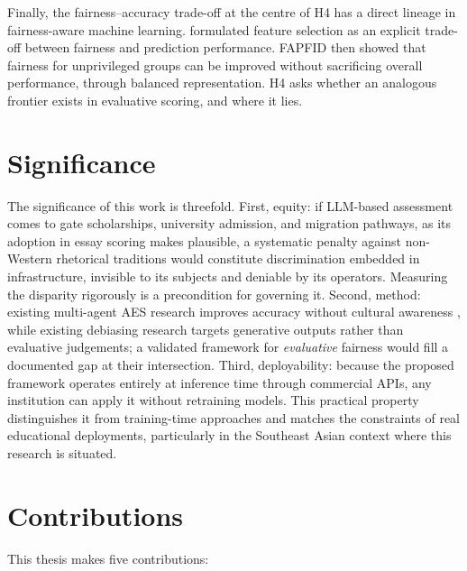 Finally, the fairness--accuracy trade-off at the centre of H4 has a
direct lineage in fairness-aware machine learning.
\citet{dorleon2022feature} formulated feature selection as an explicit
trade-off between fairness and prediction performance. FAPFID
\citep{dorleon2023fapfid} then showed that fairness for unprivileged
groups can be improved without sacrificing overall performance,
through balanced representation. H4 asks whether an analogous frontier
exists in evaluative scoring, and where it lies.

\section{Significance}
\label{sec:significance}

The significance of this work is threefold. First, equity: if
LLM-based assessment comes to gate scholarships, university
admission, and migration pathways, as its adoption in essay scoring
makes plausible, a systematic penalty against non-Western
rhetorical traditions would constitute discrimination embedded in
infrastructure, invisible to its subjects and deniable by its
operators. Measuring the disparity rigorously is a precondition for
governing it. Second, method: existing multi-agent AES research
improves accuracy without cultural awareness
\citep[e.g.,][]{su2025cafes}, while existing debiasing research targets
generative outputs rather than evaluative judgements; a validated
framework for \emph{evaluative} fairness would fill a documented gap at
their intersection. Third, deployability: because the proposed
framework operates entirely at inference time through commercial APIs,
any institution can apply it without retraining models. This practical
property distinguishes it from training-time approaches and
matches the constraints of real educational deployments, particularly
in the Southeast Asian context where this research is situated.

\section{Contributions}
\label{sec:contributions}


This thesis makes five contributions:

